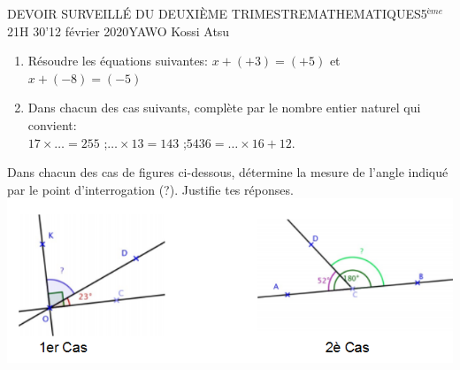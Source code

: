 \documentclass[12pt,a4paper]{book}
\newcommand{\prof}{YAWO Kossi Atsu}
\newcommand{\matiere}{MATHEMATIQUES}
\newcommand{\classe}{5$^{ème}$}
\begin{document}
\begin{devoir}{DEVOIR SURVEILLÉ DU DEUXIÈME TRIMESTRE}{\matiere}{\classe}{2}{1H 30'}{12 février 2020}{\prof}
\begin{exo}[10]
\begin{enumerate}
\item Résoudre les équations suivantes:
$x+(+3)=(+5)$ \qquad et \qquad $x+(-8)=(-5)$
\item Dans chacun des cas suivants, complète par le nombre entier naturel qui convient:\\
$17 \times \ldots=255$ \qquad ;\qquad $\ldots \times 13=143$ \qquad ;\qquad $5436=\ldots \times 16 +12$.
\end{enumerate}
\end{exo}

\begin{exo}[4]
Dans chacun des cas de figures ci-dessous, détermine la mesure de l'angle indiqué par le point d'interrogation (?). Justifie tes réponses.\\
\includegraphics[scale=0.7]{images/dev2_2020_img1.png}
\end{exo}

\end{devoir}
\end{document}

